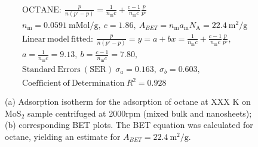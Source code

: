 

\begin{align*}
&\mathrm{OCTANE:}\ \frac{p}{n(p^\circ-p)}=\frac{1}{n_\mathrm{m}c}+\frac{c-1}{n_\mathrm{m}c}\frac{p}{p^\circ}\\
&{n_\mathrm{m}}=0.0591\ \mathrm{mMol/g},\ c=1.86,\ A_{BET}={n_\mathrm{m}}{a_\mathrm{m}}{N_\mathrm{A}}=22.4\ \mathrm{m}^2\mathrm{/g}\\
&\mathrm{Linear\ model\ fitted:}\ \frac{p}{n(p^\circ-p)}=y=a+bx=\frac{1}{n_\mathrm{m}c}+\frac{c-1}{n_\mathrm{m}c}\frac{p}{p^\circ},\\
&a=\frac{1}{n_\mathrm{m}c}=9.13,\ b=\frac{c-1}{n_\mathrm{m}c}=7.80,\\
&\mathrm{Standard\ Errors\ (SER)}\ \sigma_a=0.163,\ \sigma_b=0.603,\\
&\mathrm{Coefficient\ of\ Determination}\ R^2 = 0.928
\end{align*}


\begin{figure}[htb]
\hfill
{}
\caption{(a) Adsorption isotherm for the adsorption of octane at XXX K on MoS$_2$ 
sample centrifuged at 2000rpm (mixed bulk and nanosheets);
(b) corresponding BET plots. The BET equation was calculated for octane, yielding an estimate for $A_{BET}=22.4\ \mathrm{m}^2\mathrm{/g}$.}

\label{fig:sa-Nanosheets-Prep-I-750rpm-20mg-01-3mm-30C-S2-SA-10ml}
\end{figure}


